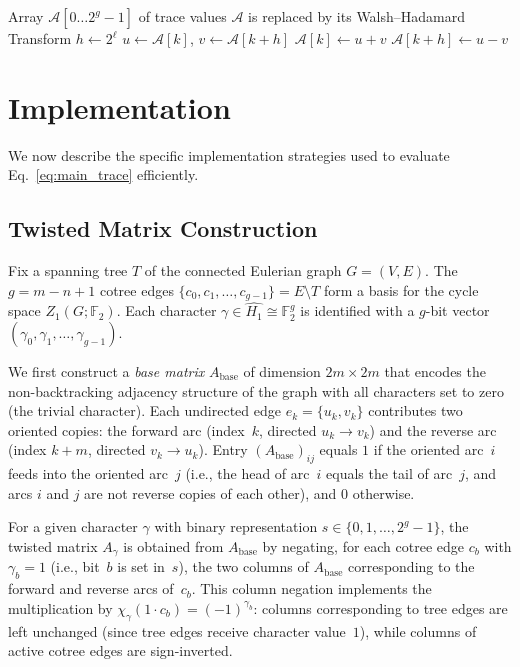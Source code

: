 \documentclass[acmsmall,review]{acmart}
\newcommand{\F}{\mathbb{F}_2}
\begin{document}
	\begin{algorithm}[H]
		\caption{In-Place Fast Walsh--Hadamard Transform}
		\label{alg:fwht_inplace}
		\begin{algorithmic}[1]
			\Require Array $\mathcal{A}[0 \ldots 2^g - 1]$ of trace values
			\Ensure $\mathcal{A}$ is replaced by its Walsh--Hadamard Transform
			\State $h \gets 2^\ell$
			\State $u \gets \mathcal{A}[k]$, \quad $v \gets \mathcal{A}[k + h]$
			\State $\mathcal{A}[k] \gets u + v$
			\State $\mathcal{A}[k + h] \gets u - v$
			\EndFor
			\EndFor
			\EndFor
		\end{algorithmic}
	\end{algorithm}

	\section{Implementation}
	\label{sec:algorithm}
	We now describe the specific implementation strategies used to evaluate Eq.~\eqref{eq:main_trace} efficiently.
	
	\subsection{Twisted Matrix Construction}
	\label{subsec:twisted_construction}
	
	Fix a spanning tree $T$ of the connected Eulerian graph $G = (V, E)$. The $g = m - n + 1$ cotree edges $\{c_0, c_1, \ldots, c_{g-1}\} = E \setminus T$ form a basis for the cycle space $Z_1(G; \F)$. Each character $\gamma \in \widehat{H_1} \cong \F^g$ is identified with a $g$-bit vector $(\gamma_0, \gamma_1, \ldots, \gamma_{g-1})$.
	
	We first construct a \emph{base matrix} $A_{\text{base}}$ of dimension $2m \times 2m$ that encodes the non-backtracking adjacency structure of the graph with all characters set to zero (the trivial character). Each undirected edge $e_k = \{u_k, v_k\}$ contributes two oriented copies: the forward arc (index~$k$, directed $u_k \to v_k$) and the reverse arc (index $k + m$, directed $v_k \to u_k$). Entry $(A_{\text{base}})_{ij}$ equals $1$ if the oriented arc~$i$ feeds into the oriented arc~$j$ (i.e., the head of arc~$i$ equals the tail of arc~$j$, and arcs $i$ and $j$ are not reverse copies of each other), and $0$ otherwise.
	
	For a given character $\gamma$ with binary representation $s \in \{0, 1, \ldots, 2^g - 1\}$, the twisted matrix $A_\gamma$ is obtained from $A_{\text{base}}$ by negating, for each cotree edge $c_b$ with $\gamma_b = 1$ (i.e., bit~$b$ is set in~$s$), the two columns of $A_{\text{base}}$ corresponding to the forward and reverse arcs of~$c_b$. This column negation implements the multiplication by $\chi_\gamma(1 \cdot c_b) = (-1)^{\gamma_b}$: columns corresponding to tree edges are left unchanged (since tree edges receive character value~$1$), while columns of active cotree edges are sign-inverted.
	
\end{document}
